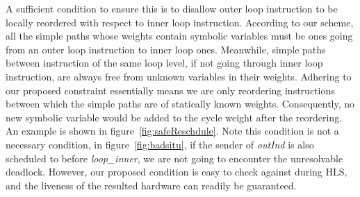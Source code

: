 A sufficient condition to ensure this is to disallow
outer loop instruction to be locally reordered with respect to inner loop instruction.
According to our scheme, all the simple paths whose weights contain symbolic variables must be ones going from an outer loop instruction to inner loop ones.
Meanwhile,
simple paths between instruction 
of the same loop level, if not going through inner loop instruction, are 
always free from unknown variables in their weights. Adhering to our proposed constraint
essentially means we are only reordering instructions between which the simple paths are of statically known weights. 
Consequently, no new symbolic variable would be added to the cycle
weight after the reordering. An example is shown in figure~\ref{fig:safeReschdule}. Note this condition is not a necessary condition, in figure~\ref{fig:badsitu}, if the sender of \textit{outInd} is also scheduled to before \textit{loop\_inner}, we are not going to encounter the
unresolvable deadlock. However, our proposed condition is easy to check against during HLS, and the liveness of the resulted hardware can  readily be guaranteed.




